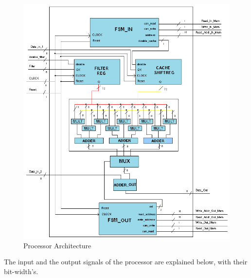 \documentclass[11pt,a4paper]{article}
\begin{document}
\begin{figure}[h]
	\centering
		\includegraphics[width=6in]{./images/insideproc.PNG}
	\caption{Processor Architecture}	\label{fig:procdetail}
\end{figure}

\FloatBarrier

The input and the output signals of the processor are explained below, with their bit-width's.
\end{document}
